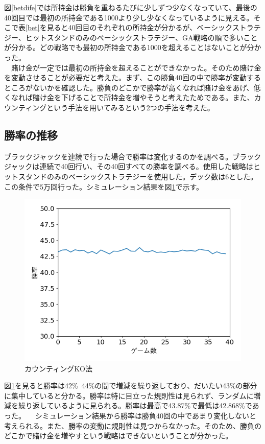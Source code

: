 図\ref{betdife}では所持金は勝負を重ねるたびに少しずつ少なくなっていて、最後の40回目では最初の所持金である1000より少し少なくなっているように見える。そこで表\ref{bet}を見ると40回目のそれぞれの所持金が分かるが、ベーシックストラテジー、ヒットスタンドのみのベーシックストラテジー、GA戦略の順で多いことが分かる。どの戦略でも最初の所持金である1000を超えることはないことが分かった。\\
　賭け金が一定では最初の所持金を超えることができなかった。そのため賭け金を変動させることが必要だと考えた。まず、この勝負40回の中で勝率が変動するところがないかを確認した。勝負のどこかで勝率が高くなれば賭け金をあげ、低くなれば賭け金を下げることで所持金を増やそうと考えたためである。また、カウンティングという手法を用いてみるという2つの手法を考えた。

\subsection{勝率の推移}
ブラックジャックを連続で行った場合で勝率は変化するのかを調べる。ブラックジャックは連続で40回行い、その40回すべての勝率を調べる。使用した戦略はヒットスタンドのみのベーシックストラテジーを使用した。デック数は6とした。この条件で5万回行った。シミュレーション結果を図\ref{win}で示す。
\begin{figure}[H]
 \begin{center} 
  \includegraphics[width=0.7\linewidth]{./figure/win}
  \caption{カウンティングKO法\label{win}}
 \end{center}
\end{figure}
図\ref{win}を見ると勝率は42\%~44\%の間で増減を繰り返しており、だいたい43\%の部分に集中していると分かる。勝率は特に目立った規則性は見られず、ランダムに増減を繰り返しているように見られる。勝率は最高で43.87\%で最低は42.868\%であった。
　シミュレーション結果から勝率は勝負40回の中であまり変化しないと考えられる。また、勝率の変動に規則性は見つからなかった。そのため、勝負のどこかで賭け金を増やすという戦略はできないということが分かった。

